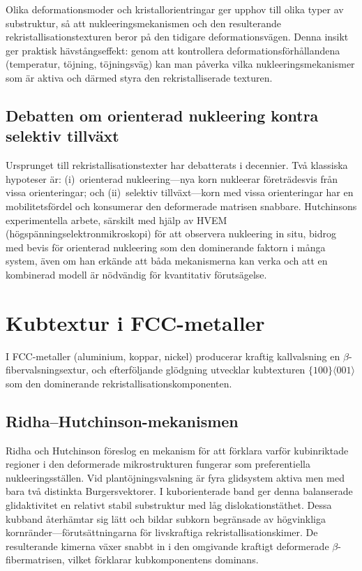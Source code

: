 \documentclass[11pt,a4paper]{article}
\begin{document}
Olika deformationsmoder och kristallorientringar ger upphov till olika
typer av substruktur, s\aa{} att nukleeringsmekanismen och den
resulterande rekristallisationstexturen beror p\aa{} den tidigare
deformationsv\"agen.  Denna insikt ger praktisk h\"avst\aa{}ngseffekt:
genom att kontrollera deformationsf\"orh\aa{}llandena (temperatur,
t\"ojning, t\"ojningsv\"ag) kan man p\aa{}verka vilka
nukleeringsmekanismer som \"ar aktiva och d\"armed styra den
rekristalliserade texturen.

\subsection{Debatten om orienterad nukleering kontra selektiv tillv\"axt}

Ursprunget till rekristallisationstexter har debatterats i decennier.
Tv\aa{} klassiska hypoteser \"ar: (i)~orienterad nukleering---nya korn
nukleerar f\"oretr\"adesvis fr\aa{}n vissa orienteringar; och (ii)~selektiv
tillv\"axt---korn med vissa orienteringar har en mobilitetsf\"ordel och
konsumerar den deformerade matrisen snabbare.  Hutchinsons experimentella
arbete, s\"arskilt med hj\"alp av HVEM (h\"ogsp\"anningselektronmikroskopi)
f\"or att observera nukleering in situ, bidrog med bevis f\"or orienterad
nukleering som den dominerande faktorn i m\aa{}nga system, \"aven om han
erk\"ande att b\aa{}da mekanismerna kan verka och att en kombinerad
modell \"ar n\"odv\"andig f\"or kvantitativ f\"oruts\"agelse.

\section{Kubtextur i FCC-metaller}
\label{sec:cube}

I FCC-metaller (aluminium, koppar, nickel) producerar kraftig
kallvalsning en $\beta$-fibervalsningsextur, och efterf\"oljande
gl\"odgning utvecklar kubtexturen
$\{100\}\langle 001\rangle$ som den dominerande
rekristallisationskomponenten.

\subsection{Ridha--Hutchinson-mekanismen}

Ridha och Hutchinson \cite{Ridha1982} f\"oreslog en mekanism f\"or att
f\"orklara varf\"or kubinriktade regioner i den deformerade
mikrostrukturen fungerar som preferentiella nukleeringsst\"allen.  Vid
plant\"ojningsvalsning \"ar fyra glidsystem aktiva men med bara tv\aa{}
distinkta Burgersvektorer.  I kuborienterade band ger denna balanserade
glidaktivitet en relativt stabil substruktur med l\aa{}g
dislokationst\"athet.  Dessa kubband \aa{}terh\"amtar sig l\"att och
bildar subkorn begr\"ansade av h\"ogvinkliga kornr\"ander---f\"oruts\"att\-ningarna
f\"or livskraftiga rekristallisationskimer.  De resulterande kimerna
v\"axer snabbt in i den omgivande kraftigt deformerade
$\beta$-fibermatrisen, vilket f\"orklarar kubkomponentens dominans.
\end{document}
